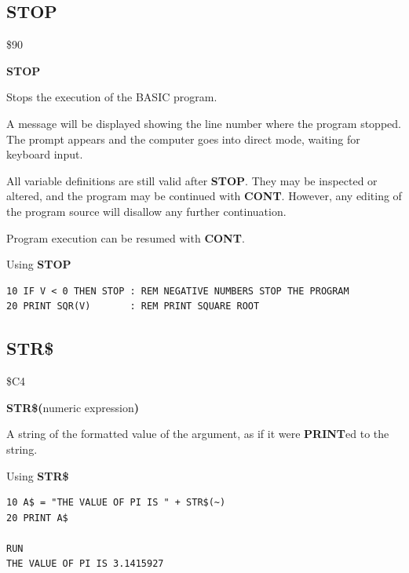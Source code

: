 \newpage
\subsection{STOP}
\begin{description}[leftmargin=2cm,style=nextline]
\item [Token:]    \$90

\item [Format:]   {\bf STOP}

\item [Usage:]    Stops the execution of the BASIC program.

                  A message will be displayed showing the line number where the program stopped. The  prompt appears and the computer goes into direct mode, waiting for keyboard input.

\item [Remarks:]  All variable definitions are still valid after {\bf STOP}. They may be inspected or altered, and the program may be continued with {\bf CONT}. However, any editing of the program source will disallow any further continuation.

                  Program execution can be resumed with {\bf CONT}.

\item [Example:]  Using {\bf STOP}

\begin{tcolorbox}[colback=black,coltext=white]
\verbatimfont{\codefont}
\begin{verbatim}
10 IF V < 0 THEN STOP : REM NEGATIVE NUMBERS STOP THE PROGRAM
20 PRINT SQR(V)       : REM PRINT SQUARE ROOT
\end{verbatim}
\end{tcolorbox}
\end{description}


\newpage
\subsection{STR\$}
\begin{description}[leftmargin=2cm,style=nextline]
\item [Token:]    \$C4

\item [Format:]   {\bf STR\$(}numeric expression{\bf)}

\item [Returns:]  A string of the formatted value of the argument, as if it were {\bf PRINT}ed to the string.

\item [Example:]  Using {\bf STR\$}

\begin{tcolorbox}[colback=black,coltext=white]
\verbatimfont{\codefont}
\begin{verbatim}
10 A$ = "THE VALUE OF PI IS " + STR$(~)
20 PRINT A$

RUN
THE VALUE OF PI IS 3.1415927
\end{verbatim}
\end{tcolorbox}
\end{description}


